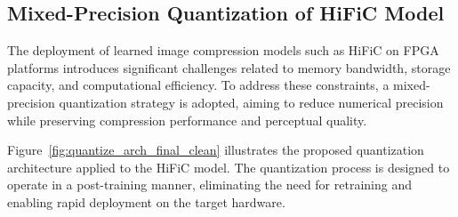 \subsection{Mixed-Precision Quantization of HiFiC Model}

The deployment of learned image compression models such as HiFiC on FPGA platforms introduces significant challenges related to memory bandwidth, storage capacity, and computational efficiency. To address these constraints, a mixed-precision quantization strategy is adopted, aiming to reduce numerical precision while preserving compression performance and perceptual quality.

Figure~\ref{fig:quantize_arch_final_clean} illustrates the proposed quantization architecture applied to the HiFiC model. The quantization process is designed to operate in a post-training manner, eliminating the need for retraining and enabling rapid deployment on the target hardware.

